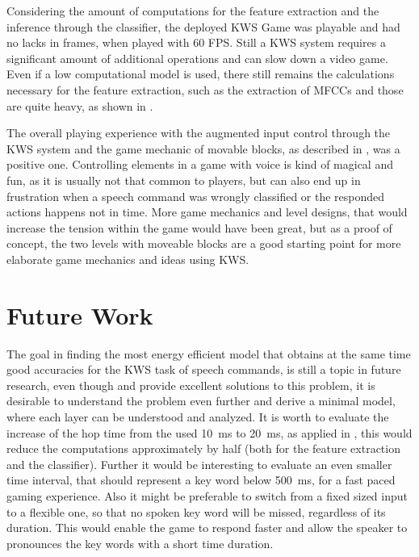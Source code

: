 Considering the amount of computations for the feature extraction and the inference through the classifier, the deployed KWS Game was playable and had no lacks in frames, when played with 60 FPS.
Still a KWS system requires a significant amount of additional operations and can slow down a video game.
Even if a low computational model is used, there still remains the calculations necessary for the feature extraction, such as the extraction of MFCCs and those are quite heavy, as shown in .

The overall playing experience with the augmented input control through the KWS system and the game mechanic of movable blocks, as described in , was a positive one.
Controlling elements in a game with voice is kind of magical and fun, as it is usually not that common to players, but can also end up in frustration when a speech command was wrongly classified or the responded actions happens not in time.
More game mechanics and level designs, that would increase the tension within the game would have been great, but as a proof of concept, the two levels with moveable blocks are a good starting point for more elaborate game mechanics and ideas using KWS.



\section{Future Work}
\thesisStateReady
The goal in finding the most energy efficient model that obtains at the same time good accuracies for the KWS task of speech commands, is still a topic in future research, even though \cite{Zhang2017} and \cite{Peter2020} provide excellent solutions to this problem, it is desirable to understand the problem even further and derive a minimal model, where each layer can be understood and analyzed.
It is worth to evaluate the increase of the hop time from the used \SI{10}{\milli\second} to \SI{20}{\milli\second}, as applied in \cite{Peter2020}, this would reduce the computations approximately by half (both for the feature extraction and the classifier).
Further it would be interesting to evaluate an even smaller time interval, that should represent a key word below \SI{500}{\milli\second}, for a fast paced gaming experience.
Also it might be preferable to switch from a fixed sized input to a flexible one, so that no spoken key word will be missed, regardless of its duration.
This would enable the game to respond faster and allow the speaker to pronounces the key words with a short time duration.

